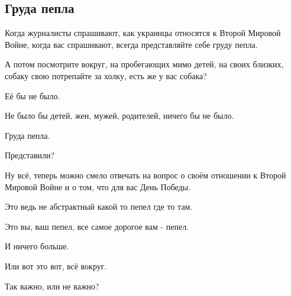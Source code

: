  
 
 
 
 
\subsection{Груда пепла}
\label{sec:07_05_2021.fb.buzhanskij_maksim.1.vov_pepel_mirvojna}

Когда журналисты спрашивают, как украинцы относятся к Второй Мировой Войне,
когда вас спрашивают, всегда представляйте себе груду пепла.

А потом посмотрите вокруг, на пробегающих мимо детей, на своих близких, собаку
свою потрепайте за холку, есть же у вас собака?

Её бы не было.

Не было бы детей, жен, мужей, родителей, ничего бы не было.

Груда пепла.

Представили?

Ну всё, теперь можно смело отвечать на вопрос о своём отношении к Второй
Мировой Войне и о том, что для вас День Победы.

Это ведь не абстрактный какой то пепел где то там.

Это вы, ваш пепел, все самое дорогое вам - пепел.

И ничего больше.

Или вот это вот, всё вокруг.

Так важно, или не важно?
